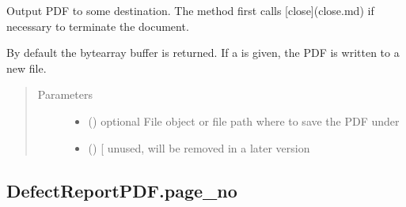 \documentclass[letterpaper,10pt,english]{sphinxmanual}
\begin{document}
\begin{fulllineitems}
\begin{fulllineitems}
\label{\detokenize{generated/quality_assessment.quality_pdf_report.DefectReportPDF.output:quality_assessment.quality_pdf_report.DefectReportPDF.output}}
\sphinxAtStartPar
Output PDF to some destination.
The method first calls {[}close{]}(close.md) if necessary to terminate the document.

\sphinxAtStartPar
By default the bytearray buffer is returned.
If a  is given, the PDF is written to a new file.
\begin{quote}\begin{description}
\item[{Parameters}] \leavevmode\begin{itemize}
\item {} 
\sphinxAtStartPar
{} () \textendash{} optional File object or file path where to save the PDF under

\item {} 
\sphinxAtStartPar
{} () \textendash{} {[}\sphinxstylestrong{DEPRECATED}{]} unused, will be removed in a later version

\end{itemize}

\end{description}\end{quote}

\end{fulllineitems}



\subsection{DefectReportPDF.page\_no}
\label{\detokenize{generated/quality_assessment.quality_pdf_report.DefectReportPDF.page_no:defectreportpdf-page-no}}\label{\detokenize{generated/quality_assessment.quality_pdf_report.DefectReportPDF.page_no::doc}}


\end{fulllineitems}
\end{document}
